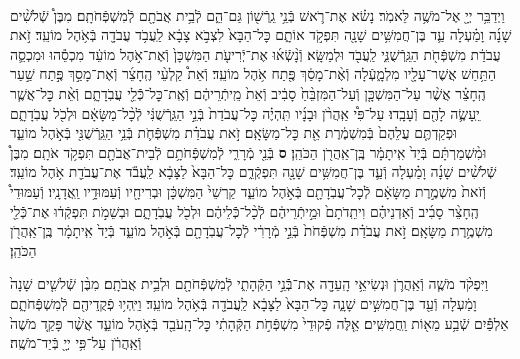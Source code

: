 \documentclass[twoside, openany, parskip=half, 11pt]{book}
\begin{document}
\begin{footnotesize}
\begin{multicols}{2}
\\
וַיְדַבֵּ֥ר יְיָ֖ אֶל־מֹשֶׁ֥ה לֵּאמֹֽר׃ נָשׂ֗א אֶת־רֹ֛אשׁ בְּֿנֵ֥י גֵֽרְֿשׁ֖וֹן גַּם־הֵ֑ם לְֿבֵ֥ית אֲבֹתָ֖ם לְֿמִשְׁפְּֿחֹתָֽם׃ מִבֶּן֩ שְֿׁלֹשִׁ֨ים שָׁנָ֜ה וָמַ֗עְלָה עַ֛ד בֶּן־חֲמִשִּׁ֥ים שָׁנָ֖ה תִּפְקֹ֣ד אוֹתָ֑ם כׇּל־הַבָּא֙ לִצְבֹ֣א צָבָ֔א לַֽעֲבֹ֥ד עֲבֹדָ֖ה בְּֿאֹ֥הֶל מוֹעֵֽד׃ זֹ֣את עֲבֹדַ֔ת מִשְׁפְּֿחֹ֖ת הַגֵּֽרְֿשֻׁנִּ֑י לַֽעֲבֹ֖ד וּלְמַשָּֽׂא׃  וְֿנָ֨שְֿׂא֜וּ אֶת־יְֿרִיעֹ֤ת הַמִּשְׁכָּן֙ וְֿאֶת־אֹ֣הֶל מוֹעֵ֔ד מִכְסֵ֕הוּ וּמִכְסֵ֛ה הַתַּ֥חַשׁ אֲשֶׁר־עָלָ֖יו מִלְמָ֑עְֿלָה וְֿאֶ֨ת־מָסַ֔ךְ פֶּ֖תַח אֹ֥הֶל מוֹעֵֽד׃ וְֿאֵת֩ קַלְעֵ֨י הֶֽחָצֵ֜ר וְֿאֶת־מָסַ֣ךְ פֶּ֣תַח שַׁ֣עַר הֶֽחָצֵ֗ר אֲשֶׁ֨ר עַל־הַמִּשְׁכָּ֤ן וְֿעַל־הַמִּזְבֵּ֨חַ֙ סָבִ֔יב וְֿאֵת֙ מֵֽיתְֿרֵיהֶ֔ם וְֿאֶֽת־כׇּל־כְּֿֿלֵ֖י עֲבֹֽדָתָ֑ם וְֿאֵ֨ת כׇּל־אֲשֶׁ֧ר יֵֽעָשֶׂ֛ה לָהֶ֖ם וְֿעָבָֽדוּ׃ עַל־פִּ֩י אַֽהֲרֹ֨ן וּבָנָ֜יו תִּֽהְיֶ֗ה כׇּל־עֲבֹדַת֙ בְּֿנֵ֣י הַגֵּֽרְֿשֻׁנִּ֔י לְֿכָ֨ל־מַשָּׂאָ֔ם וּלְכֹ֖ל עֲבֹֽדָתָ֑ם וּפְקַדְתֶּ֤ם עֲלֵהֶם֙ בְּֿמִשְׁמֶ֔רֶת אֵ֖ת כׇּל־מַשָּׂאָֽם׃ זֹ֣את עֲבֹדַ֗ת מִשְׁפְּֿחֹ֛ת בְּֿנֵ֥י הַגֵּֽרְֿשֻׁנִּ֖י בְּֿאֹ֣הֶל מוֹעֵ֑ד וּמִ֨שְׁמַרְתָּ֔ם בְּֿיַד֙ אִֽיתָמָ֔ר בֶּֽן־אַֽהֲרֹ֖ן הַכֹּהֵֽן׃ \textbf{ס}  בְּֿנֵ֖י מְֿרָרִ֑י לְֿמִשְׁפְּֿחֹתָ֥ם לְֿבֵית־אֲבֹתָ֖ם תִּפְקֹ֥ד אֹתָֽם׃ מִבֶּן֩ שְֿׁלֹשִׁ֨ים שָׁנָ֜ה וָמַ֗עְלָה וְֿעַ֛ד בֶּן־חֲמִשִּׁ֥ים שָׁנָ֖ה תִּפְקְֿדֵ֑ם כׇּל־הַבָּא֙ לַצָּבָ֔א לַֽעֲבֹ֕ד אֶת־עֲבֹדַ֖ת אֹ֥הֶל מוֹעֵֽד׃ וְֿזֹאת֙ מִשְׁמֶ֣רֶת מַשָּׂאָ֔ם לְֿכׇל־עֲבֹֽדָתָ֖ם בְּֿאֹ֣הֶל מוֹעֵ֑ד קַרְשֵׁי֙ הַמִּשְׁכָּ֔ן וּבְרִיחָ֖יו וְֿעַמּוּדָ֥יו וַֽאֲדָנָֽיו׃ וְֿעַמּוּדֵי֩ הֶֽחָצֵ֨ר סָבִ֜יב וְֿאַדְנֵיהֶ֗ם וִיתֵֽדֹתָם֙ וּמֵ֣יתְֿרֵיהֶ֔ם לְֿכָ֨ל־כְּֿֿלֵיהֶ֔ם וּלְכֹ֖ל עֲבֹֽדָתָ֑ם וּבְשֵׁמֹ֣ת תִּפְקְֿד֔וּ אֶת־כְּֿֿלֵ֖י מִשְׁמֶ֥רֶת מַשָּׂאָֽם׃ זֹ֣את עֲבֹדַ֗ת מִשְׁפְּֿחֹת֙ בְּֿנֵ֣י מְֿרָרִ֔י לְֿכׇל־עֲבֹֽדָתָ֖ם בְּֿאֹ֣הֶל מוֹעֵ֑ד בְּֿיַד֙ אִֽיתָמָ֔ר בֶּֽן־אַֽהֲרֹ֖ן הַכֹּהֵֽן׃


וַיִּפְקֹ֨ד מֹשֶׁ֧ה וְֿאַֽהֲרֹ֛ן וּנְשִׂיאֵ֥י הָֽעֵדָ֖ה אֶת־בְּֿֿנֵ֣י הַקְּֿהָתִ֑י לְֿמִשְׁפְּֿחֹתָ֖ם וּלְבֵ֥ית אֲבֹתָֽם׃ מִבֶּ֨ן שְֿׁלשִׁ֤ים שָׁנָה֙ וָמַ֔עְלָה וְֿעַ֖ד בֶּן־חֲמִשִּׁ֣ים שָׁנָ֑ה כׇּל־הַבָּא֙ לַצָּבָ֔א לַֽעֲבֹדָ֖ה בְּֿאֹ֥הֶל מוֹעֵֽד׃ וַיִּֽהְי֥וּ פְֿקֻֽדֵיהֶ֖ם לְֿמִשְׁפְּֿחֹתָ֑ם אַלְפַּ֕יִם שְֿׁבַ֥ע מֵא֖וֹת וַֽחֲמִשִּֽׁים׃ אֵ֤לֶּה פְֿקוּדֵי֙ מִשְׁפְּֿחֹ֣ת הַקְּֿהָתִ֔י כׇּל־הָֽעֹבֵ֖ד בְּֿאֹ֣הֶל מוֹעֵ֑ד אֲשֶׁ֨ר פָּקַ֤ד מֹשֶׁה֙ וְֿאַֽהֲרֹ֔ן עַל־פִּ֥י יְיָ֖ בְּֿיַד־מֹשֶֽׁה׃



\end{multicols}
\end{footnotesize}
\end{document}

